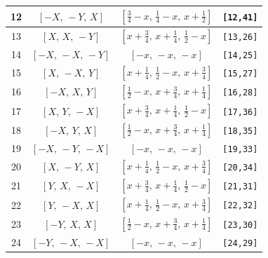 \documentclass[fleqn,8pt]{jsarticle}
\begin{document}
\begin{longtable}{cccc}
12 & $\left[ - X,\, - Y,\, X \right]$ & $\left[ \frac{3}{4} - x,\, \frac{1}{4} - x,\, x + \frac{1}{2} \right]$ & {\tt [12,41]} \\ \hline
13 & $\left[ X,\, X,\, - Y \right]$ & $\left[ x + \frac{3}{4},\, x + \frac{1}{4},\, \frac{1}{2} - x \right]$ & {\tt [13,26]} \\ \hline
14 & $\left[ - X,\, - X,\, - Y \right]$ & $\left[ - x,\, - x,\, - x \right]$ & {\tt [14,25]} \\ \hline
15 & $\left[ X,\, - X,\, Y \right]$ & $\left[ x + \frac{1}{4},\, \frac{1}{2} - x,\, x + \frac{3}{4} \right]$ & {\tt [15,27]} \\ \hline
16 & $\left[ - X,\, X,\, Y \right]$ & $\left[ \frac{1}{2} - x,\, x + \frac{3}{4},\, x + \frac{1}{4} \right]$ & {\tt [16,28]} \\ \hline
17 & $\left[ X,\, Y,\, - X \right]$ & $\left[ x + \frac{3}{4},\, x + \frac{1}{4},\, \frac{1}{2} - x \right]$ & {\tt [17,36]} \\ \hline
18 & $\left[ - X,\, Y,\, X \right]$ & $\left[ \frac{1}{2} - x,\, x + \frac{3}{4},\, x + \frac{1}{4} \right]$ & {\tt [18,35]} \\ \hline
19 & $\left[ - X,\, - Y,\, - X \right]$ & $\left[ - x,\, - x,\, - x \right]$ & {\tt [19,33]} \\ \hline
20 & $\left[ X,\, - Y,\, X \right]$ & $\left[ x + \frac{1}{4},\, \frac{1}{2} - x,\, x + \frac{3}{4} \right]$ & {\tt [20,34]} \\ \hline
21 & $\left[ Y,\, X,\, - X \right]$ & $\left[ x + \frac{3}{4},\, x + \frac{1}{4},\, \frac{1}{2} - x \right]$ & {\tt [21,31]} \\ \hline
22 & $\left[ Y,\, - X,\, X \right]$ & $\left[ x + \frac{1}{4},\, \frac{1}{2} - x,\, x + \frac{3}{4} \right]$ & {\tt [22,32]} \\ \hline
23 & $\left[ - Y,\, X,\, X \right]$ & $\left[ \frac{1}{2} - x,\, x + \frac{3}{4},\, x + \frac{1}{4} \right]$ & {\tt [23,30]} \\ \hline
24 & $\left[ - Y,\, - X,\, - X \right]$ & $\left[ - x,\, - x,\, - x \right]$ & {\tt [24,29]} \\
\end{longtable}
\renewcommand{\arraystretch}{1.2}
\end{document}
